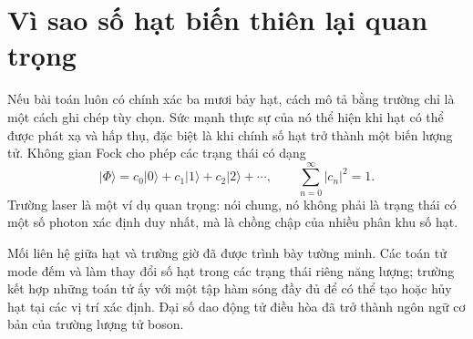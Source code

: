 \begin{classroomqa}
\end{classroomqa}

\begin{classroomqa}
\end{classroomqa}

\section{Vì sao số hạt biến thiên lại quan trọng}

Nếu bài toán luôn có chính xác ba mươi bảy hạt, cách mô tả bằng trường chỉ là một cách ghi chép tùy chọn. Sức mạnh thực sự của nó thể hiện khi hạt có thể được phát xạ và hấp thụ, đặc biệt là khi chính số hạt trở thành một biến lượng tử. Không gian Fock cho phép các trạng thái có dạng
\begin{equation}
|\Phi\rangle
=c_0|0\rangle+c_1|1\rangle+c_2|2\rangle+\cdots,
\qquad
\sum_{n=0}^{\infty}|c_n|^2=1.
\end{equation}
Trường laser là một ví dụ quan trọng: nói chung, nó không phải là trạng thái có một số photon xác định duy nhất, mà là chồng chập của nhiều phân khu số hạt.

Mối liên hệ giữa hạt và trường giờ đã được trình bày tường minh. Các toán tử mode đếm và làm thay đổi số hạt trong các trạng thái riêng năng lượng; trường kết hợp những toán tử ấy với một tập hàm sóng đầy đủ để có thể tạo hoặc hủy hạt tại các vị trí xác định. Đại số dao động tử điều hòa đã trở thành ngôn ngữ cơ bản của trường lượng tử boson.